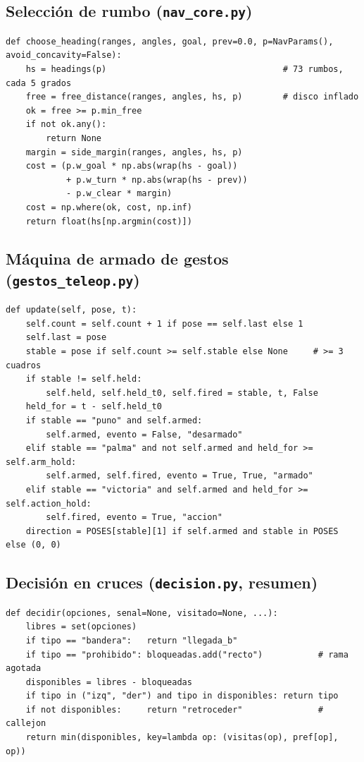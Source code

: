 \documentclass[11pt,a4paper]{article}
\begin{document}
\subsection{Selecci\'on de rumbo (\texttt{nav\_core.py})}
\begin{lstlisting}
def choose_heading(ranges, angles, goal, prev=0.0, p=NavParams(), avoid_concavity=False):
    hs = headings(p)                                   # 73 rumbos, cada 5 grados
    free = free_distance(ranges, angles, hs, p)        # disco inflado
    ok = free >= p.min_free
    if not ok.any():
        return None
    margin = side_margin(ranges, angles, hs, p)
    cost = (p.w_goal * np.abs(wrap(hs - goal))
            + p.w_turn * np.abs(wrap(hs - prev))
            - p.w_clear * margin)
    cost = np.where(ok, cost, np.inf)
    return float(hs[np.argmin(cost)])
\end{lstlisting}

\subsection{M\'aquina de armado de gestos (\texttt{gestos\_teleop.py})}
\begin{lstlisting}
def update(self, pose, t):
    self.count = self.count + 1 if pose == self.last else 1
    self.last = pose
    stable = pose if self.count >= self.stable else None     # >= 3 cuadros
    if stable != self.held:
        self.held, self.held_t0, self.fired = stable, t, False
    held_for = t - self.held_t0
    if stable == "puno" and self.armed:
        self.armed, evento = False, "desarmado"
    elif stable == "palma" and not self.armed and held_for >= self.arm_hold:
        self.armed, self.fired, evento = True, True, "armado"
    elif stable == "victoria" and self.armed and held_for >= self.action_hold:
        self.fired, evento = True, "accion"
    direction = POSES[stable][1] if self.armed and stable in POSES else (0, 0)
\end{lstlisting}

\subsection{Decisi\'on en cruces (\texttt{decision.py}, resumen)}
\begin{lstlisting}
def decidir(opciones, senal=None, visitado=None, ...):
    libres = set(opciones)
    if tipo == "bandera":   return "llegada_b"
    if tipo == "prohibido": bloqueadas.add("recto")           # rama agotada
    disponibles = libres - bloqueadas
    if tipo in ("izq", "der") and tipo in disponibles: return tipo
    if not disponibles:     return "retroceder"               # callejon
    return min(disponibles, key=lambda op: (visitas(op), pref[op], op))
\end{lstlisting}
\end{document}
